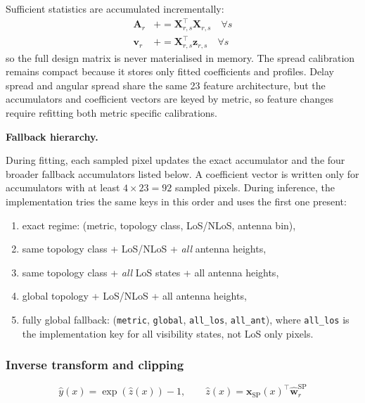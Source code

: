 Sufficient statistics are accumulated incrementally:
\begin{align}
\textbf{A}_r &\mathrel{+}= \textbf{X}_{r,s}^\top \textbf{X}_{r,s} \quad \forall s\\
\textbf{v}_r &\mathrel{+}= \textbf{X}_{r,s}^\top \textbf{z}_{r,s} \quad \forall s
\end{align}
so the full design matrix is never materialised in memory.
The spread calibration remains compact because it stores only fitted
coefficients and profiles. Delay spread and angular spread share the same
23 feature architecture, but the accumulators and coefficient vectors are keyed
by metric, so feature changes require refitting both metric specific
calibrations.

\par\smallskip
\noindent\textbf{Fallback hierarchy.}\par
\noindent During fitting, each sampled pixel updates the
exact accumulator and the four broader fallback accumulators listed below. A
coefficient vector is written only for accumulators with at least
$4 \times 23 = 92$ sampled pixels. During inference, the implementation tries
the same keys in this order and uses the first one present:
\begin{enumerate}
\item exact regime: (metric, topology class, LoS/NLoS, antenna bin),
\item same topology class + LoS/NLoS + \emph{all} antenna heights,
\item same topology class + \emph{all} LoS states + all antenna heights,
\item global topology + LoS/NLoS + all antenna heights,
\item fully global fallback: (\texttt{metric}, \texttt{global},
      \texttt{all\_los}, \texttt{all\_ant}), where \texttt{all\_los} is the
      implementation key for all visibility states, not LoS only pixels.
\end{enumerate}

\subsubsection{Inverse transform and clipping}

\begin{equation}
\hat y(x) = \exp\!\left(\hat z(x)\right) - 1,\qquad
\hat z(x) = \textbf{x}_{\mathrm{SP}}(x)^\top
\hat{\textbf{w}}^{\mathrm{SP}}_{r}
\label{eq:inv_log}
\end{equation}


